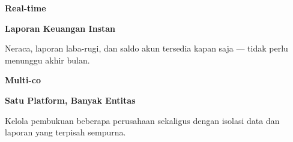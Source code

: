 \documentclass[a4paper]{article}
\begin{document}
\begin{minipage}[t]{0.485\textwidth}
    \noindent\colorbox{BlueBg}{%
        \begin{minipage}[t][2.7cm][c]{\dimexpr\linewidth-2\fboxsep\relax}
            \centering
            {\fontsize{20}{24}\selectfont\bfseries\color{BluePrimary} Real-time}\par\vspace{2pt}
            {\fontsize{9.5}{12}\selectfont\bfseries\color{BlueDark} Laporan Keuangan Instan}\par\vspace{2pt}
            {\fontsize{8.5}{11}\selectfont\color{TextDark}Neraca, laporan laba-rugi, dan saldo akun tersedia kapan saja — tidak perlu menunggu akhir bulan.}
        \end{minipage}}\par
    \vspace{6pt}
    \noindent\colorbox{BlueBg}{%
        \begin{minipage}[t][2.7cm][c]{\dimexpr\linewidth-2\fboxsep\relax}
            \centering
            {\fontsize{20}{24}\selectfont\bfseries\color{BluePrimary} Multi-co}\par\vspace{2pt}
            {\fontsize{9.5}{12}\selectfont\bfseries\color{BlueDark} Satu Platform, Banyak Entitas}\par\vspace{2pt}
            {\fontsize{8.5}{11}\selectfont\color{TextDark}Kelola pembukuan beberapa perusahaan sekaligus dengan isolasi data dan laporan yang terpisah sempurna.}
        \end{minipage}}%
\end{minipage}

\vspace{8pt}
\end{document}
